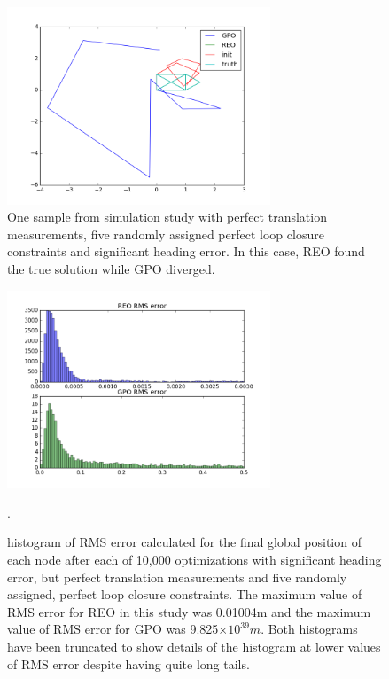 \begin{figure}[H]
  \includegraphics[width=0.7\textwidth]{figures/GPO_diverged.png}
  \caption{One sample from simulation study with perfect translation measurements, five randomly assigned perfect loop closure constraints and significant heading error.  In this case, REO found the true solution while GPO diverged.}
  \label{fig:GPO_heading_divergence}
\end{figure}

\begin{figure}[H]
  \includegraphics[width=0.7\textwidth]{figures/GPO_vs_REO_bad.png}
  \caption{histogram of RMS error calculated for the final global position of each node after each of 10,000 optimizations with significant heading error, but perfect translation measurements and five randomly assigned, perfect loop closure constraints. The maximum value of RMS error for REO in this study was 0.01004m and the maximum value of RMS error for GPO was 9.825$\times 10 ^{39}m$. Both histograms have been truncated to show details of the histogram at lower values of RMS error despite having quite long tails.}
  \label{fig:GPO_bad_histogram}.
\end{figure}

